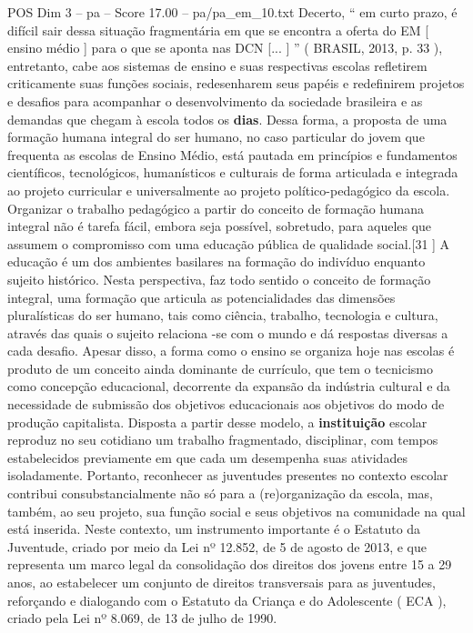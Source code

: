 \begin{textsample}{POS Dim 3 – pa – Score 17.00 – pa/pa\_em\_10.txt}
Decerto, “ em curto prazo, é difícil sair dessa situação fragmentária em que se encontra a oferta do EM [ ensino médio ] para o que se aponta nas DCN [... ] ” ( BRASIL, 2013, p. 33 ), entretanto, cabe aos sistemas de ensino e suas respectivas escolas refletirem criticamente suas funções sociais, redesenharem seus papéis e redefinirem projetos e desafios para acompanhar o desenvolvimento da sociedade brasileira e as demandas que chegam à escola todos os \textbf{dias}.
Dessa forma, a proposta de uma formação humana integral do ser humano, no caso particular do jovem que frequenta as escolas de Ensino Médio, está pautada em princípios e fundamentos científicos, tecnológicos, humanísticos e culturais de forma articulada e integrada ao projeto curricular e universalmente ao projeto político-pedagógico da escola.
Organizar o trabalho pedagógico a partir do conceito de formação humana integral não é tarefa fácil, embora seja possível, sobretudo, para aqueles que assumem o compromisso com uma educação pública de qualidade social.[31 ] A educação é um dos ambientes basilares na formação do indivíduo enquanto sujeito histórico.
Nesta perspectiva, faz todo sentido o conceito de formação integral, uma formação que articula as potencialidades das dimensões pluralísticas do ser humano, tais como ciência, trabalho, tecnologia e cultura, através das quais o sujeito relaciona -se com o mundo e dá respostas diversas a cada desafio.
Apesar disso, a forma como o ensino se organiza hoje nas escolas é produto de um conceito ainda dominante de currículo, que tem o tecnicismo como concepção educacional, decorrente da expansão da indústria cultural e da necessidade de submissão dos objetivos educacionais aos objetivos do modo de produção capitalista.
Disposta a partir desse modelo, a \textbf{instituição} escolar reproduz no seu cotidiano um trabalho fragmentado, disciplinar, com tempos estabelecidos previamente em que cada um desempenha suas atividades isoladamente.
Portanto, reconhecer as juventudes presentes no contexto escolar contribui consubstancialmente não só para a (re)organização da escola, mas, também, ao seu projeto, sua função social e seus objetivos na comunidade na qual está inserida.
Neste contexto, um instrumento importante é o Estatuto da Juventude, criado por meio da Lei nº 12.852, de 5 de agosto de 2013, e que representa um marco legal da consolidação dos direitos dos jovens entre 15 a 29 anos, ao estabelecer um conjunto de direitos transversais para as juventudes, reforçando e dialogando com o Estatuto da Criança e do Adolescente ( ECA ), criado pela Lei nº 8.069, de 13 de julho de 1990.

\end{textsample}
